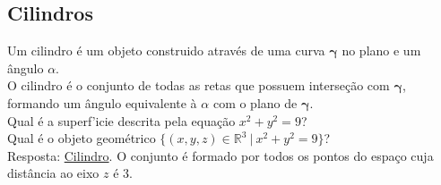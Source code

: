 \documentclass{article}
\begin{document}
\pagebreak

\subsection{Cilindros}
Um cilindro \'e um objeto construido atrav\'es de uma curva $\boldsymbol{\gamma}$ no plano e um \^angulo $\alpha$. \\[5pt]
O cilindro \'e o conjunto de todas as retas que possuem interse\c{c}\~ao com $\boldsymbol{\gamma}$, formando um \^angulo equivalente \`a $\alpha$ com o plano de $\boldsymbol{\gamma}$. \\[10pt]
Qual \'e a superf\a'icie descrita pela equa\c{c}\~ao $x^2 + y^2 = 9$? \\[5pt]
Qual \'e o objeto geom\'etrico $\{ (x, y, z) \in \mathbb{R}^3 \> | \> x^2 + y^2 = 9 \}$? \\[5pt]
Resposta: \uline{Cilindro}. O conjunto \'e formado por todos os pontos do espa\c{c}o cuja dist\^ancia ao eixo $z$ \'e $3$. \\[-5pt]
\end{document}
